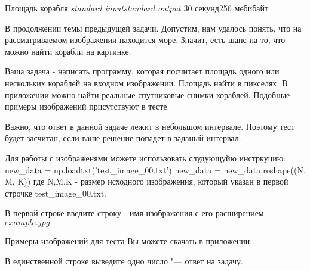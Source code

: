 \begin{problem}{Площадь корабля}
{\textsl{standard input}}{\textsl{standard output}}
{30 секунд}{256 мебибайт}{}

В продолжении темы предыдущей задачи. Допустим, нам удалось понять, что на рассматриваемом изображении находится море. Значит, есть шанс на то, что можно найти корабли на картинке. 

Ваша задача - написать программу, которая посчитает площадь одного или нескольких кораблей на входном изображении. Площадь найти в пикселях. В приложении можно найти реальные спутниковые снимки кораблей. Подобные примеры изображений присутствуют в тесте.

Важно, что ответ в данной задаче лежит в небольшом интервале. Поэтому тест будет засчитан, если ваше решение попадет в заданый интервал.

Для работы с изображенями можете использовать слудующуйю инстркуцию:
new_data = np.loadtxt('test_image_00.txt')
new_data = new_data.reshape((N, M, K))
где N,M,K - размер исходного изображения, который указан в первой строчке test_image_00.txt.

\InputFile

В первой строке введите строку - имя изображения с его расширением $example.jpg$

Примеры изображений для теста Вы можете скачать в приложении.

\OutputFile

В единственной строке выведите одно число "--- ответ на задачу.

\Examples

\begin{example}
%

%

%

\end{example}

\Explanations

\end{problem}
